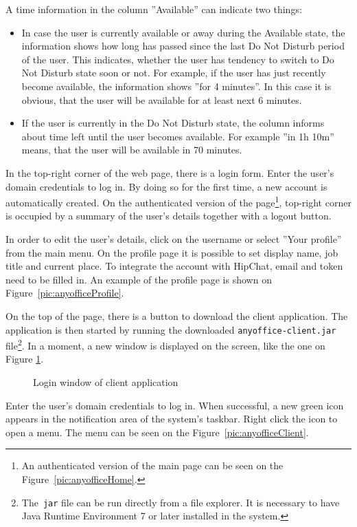 \documentclass[11pt,singleside]{myfithesis2}
\newcommand{\pict}[4]{
	\begin{figure}[h!]
  		\vspace{-7px}
  		\centerline{\fcolorbox{darkgray}{palegray}{\texttt{[image: \#2]}}}
  		\caption{#1}
  		\label{#4}
	\end{figure}
}
\begin{document}
A time information in the column ''Available'' can indicate two things:
\begin{itemize}
	\item In case the user is currently available or away during the Available state, the information shows how long has passed since the last Do Not Disturb period of the user. This indicates, whether the user has tendency to switch to Do Not Disturb state soon or not. For example, if the user has just recently become available, the information shows ''for 4 minutes''. In this case it is obvious, that the user will be available for at least next 6 minutes.
	\item If the user is currently in the Do Not Disturb state, the column informs about time left until the user becomes available. For example ''in 1h 10m'' means, that the user will be available in 70 minutes.
\end{itemize}

In the top-right corner of the web page, there is a login form. Enter the user's domain credentials to log in. By doing so for the first time, a new account is automatically created. On the authenticated version of the page\footnote{An authenticated version of the main page can be seen on the Figure~\ref{pic:anyofficeHome}.}, top-right corner is occupied by a summary of the user's details together with a logout button. 

In order to edit the user's details, click on the username or select ''Your profile'' from the main menu. On the profile page it is possible to set display name, job title and current place. To integrate the account with HipChat, email and token need to be filled in. An example of the profile page is shown on Figure~\ref{pic:anyofficeProfile}.

On the top of the page, there is a button to download the client application. The application is then started by running the downloaded \texttt{anyoffice-client.jar} file\footnote{The~\texttt{jar} file can be run directly from a file explorer.  It is necessary to have Java Runtime Environment 7 or later installed in the system.}. In a moment, a new window is displayed on the screen, like the one on Figure \ref{pic:loginWindow}. 

\pict{Login window of client application}{data/loginWindow.png}{width=0.5\textwidth}{pic:loginWindow} 

Enter the user's domain credentials to log in. When successful, a new green icon appears in the notification area of the system's taskbar. Right click the icon to open a menu. The menu can be seen on the Figure~\ref{pic:anyofficeClient}.
\end{document}
